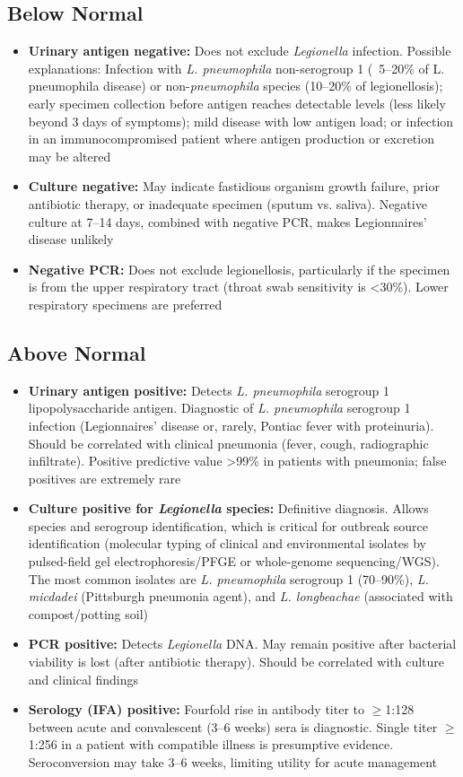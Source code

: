\subsection*{Below Normal}
\begin{itemize}
  \item \textbf{Urinary antigen negative:} Does not exclude \textit{Legionella} infection. Possible explanations: Infection with \textit{L. pneumophila} non-serogroup 1 (~5--20\% of L. pneumophila disease) or non-\textit{pneumophila} species (10--20\% of legionellosis); early specimen collection before antigen reaches detectable levels (less likely beyond 3 days of symptoms); mild disease with low antigen load; or infection in an immunocompromised patient where antigen production or excretion may be altered
  \item \textbf{Culture negative:} May indicate fastidious organism growth failure, prior antibiotic therapy, or inadequate specimen (sputum vs. saliva). Negative culture at 7--14 days, combined with negative PCR, makes Legionnaires' disease unlikely
  \item \textbf{Negative PCR:} Does not exclude legionellosis, particularly if the specimen is from the upper respiratory tract (throat swab sensitivity is <30\%). Lower respiratory specimens are preferred
\end{itemize}

\subsection*{Above Normal}
\begin{itemize}
  \item \textbf{Urinary antigen positive:} Detects \textit{L. pneumophila} serogroup 1 lipopolysaccharide antigen. Diagnostic of \textit{L. pneumophila} serogroup 1 infection (Legionnaires' disease or, rarely, Pontiac fever with proteinuria). Should be correlated with clinical pneumonia (fever, cough, radiographic infiltrate). Positive predictive value >99\% in patients with pneumonia; false positives are extremely rare
  \item \textbf{Culture positive for \textit{Legionella} species:} Definitive diagnosis. Allows species and serogroup identification, which is critical for outbreak source identification (molecular typing of clinical and environmental isolates by pulsed-field gel electrophoresis/PFGE or whole-genome sequencing/WGS). The most common isolates are \textit{L. pneumophila} serogroup 1 (70--90\%), \textit{L. micdadei} (Pittsburgh pneumonia agent), and \textit{L. longbeachae} (associated with compost/potting soil)
  \item \textbf{PCR positive:} Detects \textit{Legionella} DNA. May remain positive after bacterial viability is lost (after antibiotic therapy). Should be correlated with culture and clinical findings
  \item \textbf{Serology (IFA) positive:} Fourfold rise in antibody titer to $\geq$1:128 between acute and convalescent (3--6 weeks) sera is diagnostic. Single titer $\geq$1:256 in a patient with compatible illness is presumptive evidence. Seroconversion may take 3--6 weeks, limiting utility for acute management
\end{itemize}

